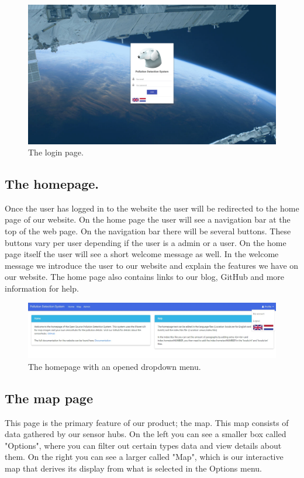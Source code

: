 \documentclass[a4paper]{article}
\begin{document}
\begin{figure}[h!]
  \caption{The login page.}
  \centering
  \includegraphics[width=1\textwidth]{login}
\end{figure}

\pagebreak

\subsection{The homepage.}
Once the user has logged in to the website the user will be redirected to the home page of our website. On the home page the user will see a navigation bar at the top of the web page. On the navigation bar there will be several buttons. These buttons vary per user depending if the user is a admin or a user. 
\newline
\newline
On the home page itself the user will see a short welcome message as well. In the welcome message we introduce the user to our website and explain the features we have on our website. The home page also contains links to our blog, GitHub and more information for help.
\begin{figure}[h!]
  \caption{The homepage with an opened dropdown menu.}
  \centering
  \includegraphics[width=1\textwidth]{home-dropdown}
\end{figure}
\pagebreak

\subsection{The map page}
This page is the primary feature of our product; the map. This map consists of data gathered by our sensor hubs. On the left you can see a smaller box called "Options", where you can filter out certain types data and view details about them. On the right you can see a larger called "Map", which is our interactive map that derives its display from what is selected in the Options menu.
\newline
\end{document}
